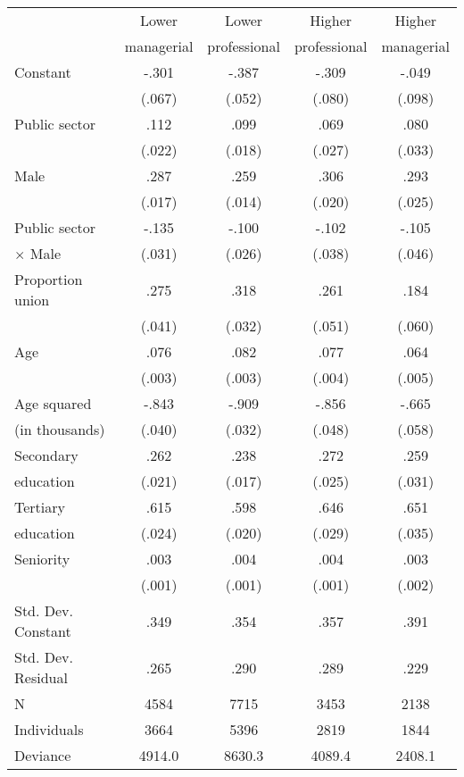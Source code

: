 \documentclass[a4paper,11pt,titlepage]{article}
\begin{document}
\begin{table}[t]
    \begin{tabularx}{\textwidth}{Ycccc}
    \toprule
			&Lower    & Lower &Higher &Higher \\
            & managerial & professional & professional & managerial \\
    \midrule
    Constant			&-.301	&-.387	&-.309	&-.049	   \\
    					&(.067)	&(.052)	&(.080)	&(.098)	    \\
    Public sector		&.112	&.099	&.069	& .080	\\
    					&(.022)	&(.018)	&(.027)	&(.033)	    \\
    Male				&.287	&.259	&.306	&.293	\\
    					&(.017)	&(.014)	&(.020)	&(.025)	\\
    Public sector		&-.135	&-.100	&-.102	&-.105	\\
    \quad $\times$ Male%
    					&(.031) &(.026)	&(.038)	&(.046)	\\
    Proportion union    &.275   &.318   &.261   &.184  \\
                        &(.041) &(.032) &(.051) &(.060) \\
    Age					&.076	&.082	&.077	&.064	\\
    					&(.003)	&(.003)	&(.004)	&(.005)	\\
    Age squared			&-.843	&-.909	&-.856	&-.665	\\
    \quad (in thousands)%
    					&(.040) &(.032)	&(.048)	&(.058)	\\
    Secondary 			&.262	&.238	&.272	&.259	\\
    \quad education	    &(.021)	&(.017)	&(.025)	&(.031)	\\
    Tertiary			&.615	&.598	&.646	&.651	\\
    \quad education	    &(.024)	&(.020)	&(.029)	&(.035)	 \\
    Seniority			&.003	&.004	&.004	&.003	\\
    					&(.001)	&(.001)	&(.001)	&(.002)	\\
    \midrule
    Std. Dev. Constant  &.349   &.354	&.357	&.391	\\
    Std. Dev. Residual  &.265   &.290	&.289	&.229	\\
    N					&4584   &7715	&3453	&2138	\\
    Individuals			&3664   &5396	&2819	&1844	\\
    Deviance			&4914.0 &8630.3 &4089.4 &2408.1   \\
    \bottomrule
    \end{tabularx}
\end{table}
\end{document}

